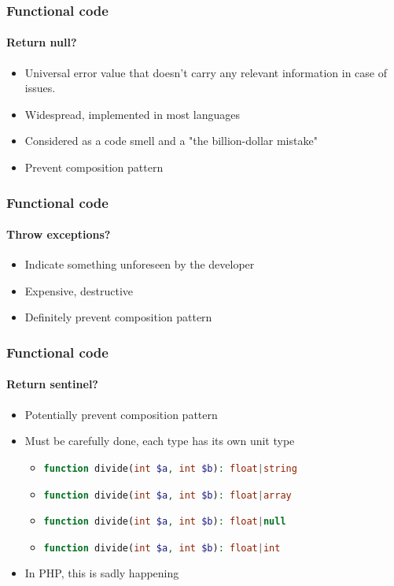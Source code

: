 \begin{frame}
    \frametitle{Functional code}
    \framesubtitle{Return null?}

    \begin{itemize}[<+->]
        \item Universal error value that doesn't carry any relevant information
            in case of issues.
        \item Widespread, implemented in most languages
        \item Considered as a code smell and a "the billion-dollar mistake"
        \item Prevent composition pattern
    \end{itemize}

\end{frame}

\begin{frame}
    \frametitle{Functional code}
    \framesubtitle{Throw exceptions?}

    \begin{itemize}[<+->]
        \item Indicate something unforeseen by the developer
        \item Expensive, destructive
        \item Definitely prevent composition pattern
    \end{itemize}

\end{frame}

\begin{frame}
    \frametitle{Functional code}
    \framesubtitle{Return sentinel?}

    \begin{itemize}[<+->]
        \item Potentially prevent composition pattern
        \item Must be carefully done, each type has its own unit type
        \begin{itemize}[<+->]
            \item \lstinline[language=PHP]!function divide(int $a, int $b): float|string!
            \item \lstinline[language=PHP]!function divide(int $a, int $b): float|array!
            \item \lstinline[language=PHP]!function divide(int $a, int $b): float|null!
            \item \lstinline[language=PHP]!function divide(int $a, int $b): float|int!
        \end{itemize}
        \item In PHP, this is sadly happening
    \end{itemize}

\end{frame}

